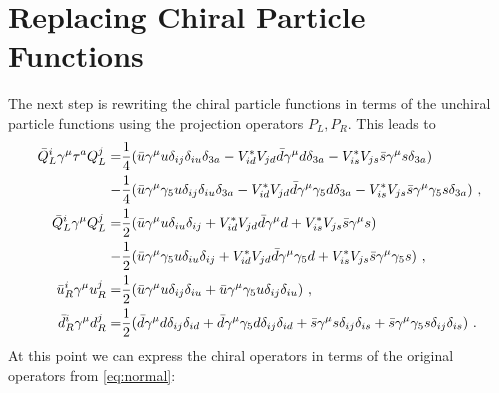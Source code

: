 \section{Replacing Chiral Particle Functions}
The next step is rewriting the chiral particle functions in terms of the unchiral particle functions using the projection operators $P_L,P_R$. This leads to
\begin{align}
	\bar{Q}_L^i\gamma^\mu\tau^a Q_L^j =&\frac{1}{4}(\bar{u}\gamma^\mu u\delta_{ij}\delta_{iu}\delta_{3a}
	- V_{id}^*V_{jd}\bar{d}\gamma^\mu d\delta_{3a} - V_{is}^*V_{js}\bar{s}\gamma^\mu s\delta_{3a})\notag \\
	-&\frac{1}{4} (\bar{u}\gamma^\mu \gamma_5u\delta_{ij}\delta_{iu}\delta_{3a} - V_{id}^*V_{jd}\bar{d}\gamma^\mu\gamma_5 d\delta_{3a} - V_{is}^*V_{js}\bar{s}\gamma^\mu\gamma_5 s\delta_{3a}) \ , \notag \\
	\bar{Q}_L^i\gamma^\mu Q_L^j =&\frac{1}{2}(
	\bar{u}\gamma^\mu u\delta_{iu}\delta_{ij} + V_{id}^*V_{jd}\bar{d}\gamma^\mu d
	+ V_{is}^*V_{js}\bar{s}\gamma^\mu s)\notag \\
	-&\frac{1}{2}(\bar{u}\gamma^\mu\gamma_5u\delta_{iu}\delta_{ij} + V_{id}^*V_{jd}\bar{d}\gamma^\mu\gamma_5d + V_{is}^*V_{js}\bar{s}\gamma^\mu\gamma_5s) \ , \notag \\
	\bar{u}_R^i\gamma^\mu u_R^j =&\frac{1}{2}(\bar{u}\gamma^\mu u\delta_{ij}\delta_{iu} + \bar{u}\gamma^\mu \gamma_5u\delta_{ij}\delta_{iu}) \ , \notag \\
	\bar{d}_R^i\gamma^\mu d_R^j =&\frac{1}{2}(\bar{d}\gamma^\mu d\delta_{ij}\delta_{id} + \bar{d}\gamma^\mu\gamma_5d\delta_{ij}\delta_{id} + \bar{s}\gamma^\mu s\delta_{ij}\delta_{is} + \bar{s}\gamma^\mu \gamma_5s\delta_{ij}\delta_{is}) \ .
\end{align}
At this point we can express the chiral operators in terms of the original operators from \eqref{eq:normal}:
